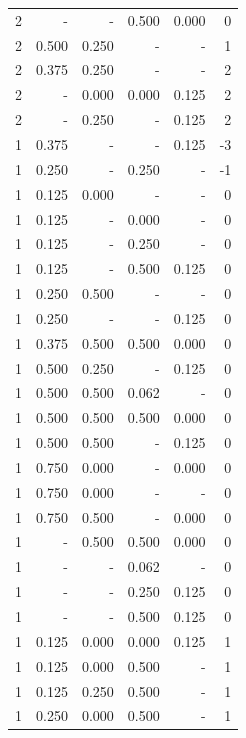 \documentclass[a4paper]{article}\usepackage{graphicx, color}
\begin{document}
\begin{table}[ht]
\begin{tabular}{rrrrrr}
   \rowcolor{sosoColor} 2 & - & - & 0.500 & 0.000 & 0 \\ 
  2 & 0.500 & 0.250 & - & - & 1 \\ 
  2 & 0.375 & 0.250 & - & - & 2 \\ 
   \rowcolor{goodColor} 2 & - & 0.000 & 0.000 & 0.125 & 2 \\ 
  2 & - & 0.250 & - & 0.125 & 2 \\ 
   \rowcolor{nullColor} 1 & 0.375 & - & - & 0.125 & -3 \\ 
   \rowcolor{sosoColor} 1 & 0.250 & - & 0.250 & - & -1 \\ 
  1 & 0.125 & 0.000 & - & - & 0 \\ 
   \rowcolor{sosoColor} 1 & 0.125 & - & 0.000 & - & 0 \\ 
   \rowcolor{sosoColor} 1 & 0.125 & - & 0.250 & - & 0 \\ 
   \rowcolor{sosoColor} 1 & 0.125 & - & 0.500 & 0.125 & 0 \\ 
  1 & 0.250 & 0.500 & - & - & 0 \\ 
   \rowcolor{nullColor} 1 & 0.250 & - & - & 0.125 & 0 \\ 
   \rowcolor{goodColor} 1 & 0.375 & 0.500 & 0.500 & 0.000 & 0 \\ 
  1 & 0.500 & 0.250 & - & 0.125 & 0 \\ 
   \rowcolor{badColor} 1 & 0.500 & 0.500 & 0.062 & - & 0 \\ 
   \rowcolor{goodColor} 1 & 0.500 & 0.500 & 0.500 & 0.000 & 0 \\ 
  1 & 0.500 & 0.500 & - & 0.125 & 0 \\ 
  1 & 0.750 & 0.000 & - & 0.000 & 0 \\ 
  1 & 0.750 & 0.000 & - & - & 0 \\ 
  1 & 0.750 & 0.500 & - & 0.000 & 0 \\ 
   \rowcolor{goodColor} 1 & - & 0.500 & 0.500 & 0.000 & 0 \\ 
   \rowcolor{sosoColor} 1 & - & - & 0.062 & - & 0 \\ 
   \rowcolor{sosoColor} 1 & - & - & 0.250 & 0.125 & 0 \\ 
   \rowcolor{sosoColor} 1 & - & - & 0.500 & 0.125 & 0 \\ 
   \rowcolor{goodColor} 1 & 0.125 & 0.000 & 0.000 & 0.125 & 1 \\ 
   \rowcolor{badColor} 1 & 0.125 & 0.000 & 0.500 & - & 1 \\ 
   \rowcolor{badColor} 1 & 0.125 & 0.250 & 0.500 & - & 1 \\ 
   \rowcolor{badColor} 1 & 0.250 & 0.000 & 0.500 & - & 1 \\ 

\end{tabular}
\end{table}
\end{document}
